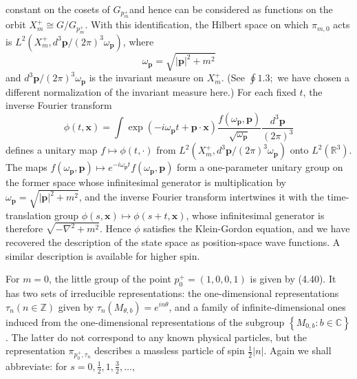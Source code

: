 \documentclass[10pt, letterpaper]{article}
\begin{document}
constant on the cosets of $G_{p_{m}^{+}}$and hence can be considered as functions on the orbit $X_{m}^{+} \cong G / G_{p_{m}^{+}}$. With this identification, the Hilbert space on which $\pi_{m, 0}$ acts is $L^{2}\left(X_{m}^{+}, d^{3} \mathbf{p} /(2 \pi)^{3} \omega_{\mathbf{p}}\right)$, where
$$
\omega_{\mathbf{p}}=\sqrt{|\mathbf{p}|^{2}+m^{2}}
$$
and $d^{3} \mathbf{p} /(2 \pi)^{3} \omega_{\mathbf{p}}$ is the invariant measure on $X_{m}^{+}$. (See $\oint 1.3 ;$ we have chosen a different normalization of the invariant measure here.) For each fixed $t$, the inverse Fourier transform
$$
\phi(t, \mathbf{x})=\int \exp \left(-i \omega_{\mathbf{p}} t+\mathbf{p} \cdot \mathbf{x}\right) \frac{f\left(\omega_{\mathbf{p}}, \mathbf{p}\right)}{\sqrt{\omega_{\mathbf{p}}}} \frac{d^{3} \mathbf{p}}{(2 \pi)^{3}}
$$
defines a unitary map $f \mapsto \phi(t, \cdot)$ from $L^{2}\left(X_{m}^{+}, d^{3} \mathbf{p} /(2 \pi)^{3} \omega_{\mathbf{p}}\right)$ onto $L^{2}\left(\mathbb{R}^{3}\right)$. The maps $f\left(\omega_{\mathbf{p}}, \mathbf{p}\right) \mapsto e^{-i \omega_{\mathbf{p}} t} f\left(\omega_{\mathbf{p}}, \mathbf{p}\right)$ form a one-parameter unitary group on the former space whose infinitesimal generator is multiplication by $\omega_{\mathbf{p}}=\sqrt{|\mathbf{p}|^{2}+m^{2}}$, and the inverse Fourier transform intertwines it with the time-translation group $\phi(s, \mathbf{x}) \mapsto \phi(s+t, \mathbf{x})$, whose infinitesimal generator is therefore $\sqrt{-\nabla^{2}+m^{2}}$. Hence $\phi$ satisfies the Klein-Gordon equation, and we have recovered the description of the state space as position-space wave functions. A similar description is available for higher spin.




For $m=0$, the little group of the point $p_{0}^{+}=(1,0,0,1)$ is given by (4.40). It has two sets of irreducible representations: the one-dimensional representations $\tau_{n} (n \in \mathbb{Z})$ given by $\tau_{n}\left(M_{\theta, b}\right)=e^{i n \theta}$, and a family of infinite-dimensional ones induced from the one-dimensional representations of the subgroup $\left\{M_{0, b}: b \in \mathbb{C}\right\}$. The latter do not correspond to any known physical particles, but the representation $\pi_{p_{0}^{+}, \tau_{n}}$ describes a massless particle of spin $\frac{1}{2}|n|$. Again we shall abbreviate: for $s=0, \frac{1}{2}, 1, \frac{3}{2}, \ldots$,
\end{document}
